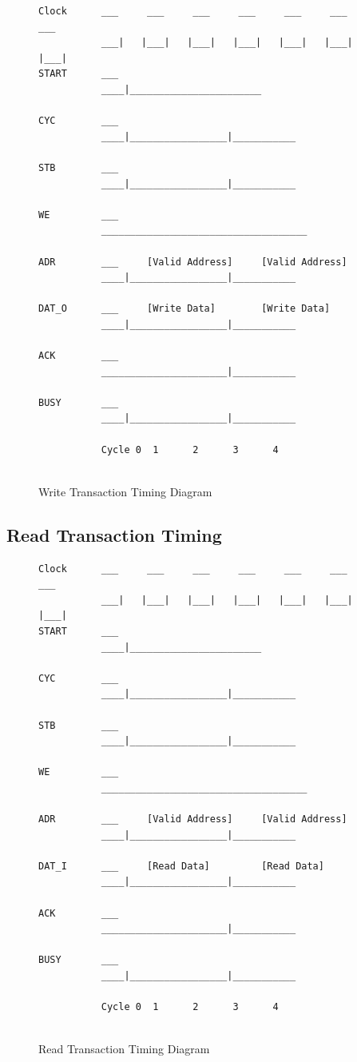 \documentclass[12pt,a4paper]{article}
\begin{document}
\begin{figure}[H]
\centering
\begin{verbatim}
Clock      ___     ___     ___     ___     ___     ___     ___
           ___|   |___|   |___|   |___|   |___|   |___|   |___|
START      ___
           ____|_______________________
           
CYC        ___
           ____|_________________|___________
           
STB        ___
           ____|_________________|___________
           
WE         ___
           ____________________________________
           
ADR        ___     [Valid Address]     [Valid Address]
           ____|_________________|___________
           
DAT_O      ___     [Write Data]        [Write Data]
           ____|_________________|___________
           
ACK        ___
           ______________________|___________
           
BUSY       ___
           ____|_________________|___________

           Cycle 0  1      2      3      4
           
\end{verbatim}
\caption{Write Transaction Timing Diagram}
\end{figure}

\subsection{Read Transaction Timing}

\begin{figure}[H]
\centering
\begin{verbatim}
Clock      ___     ___     ___     ___     ___     ___     ___
           ___|   |___|   |___|   |___|   |___|   |___|   |___|
START      ___
           ____|_______________________
           
CYC        ___
           ____|_________________|___________
           
STB        ___
           ____|_________________|___________
           
WE         ___
           ____________________________________
           
ADR        ___     [Valid Address]     [Valid Address]
           ____|_________________|___________
           
DAT_I      ___     [Read Data]         [Read Data]
           ____|_________________|___________
           
ACK        ___
           ______________________|___________
           
BUSY       ___
           ____|_________________|___________

           Cycle 0  1      2      3      4
           
\end{verbatim}
\caption{Read Transaction Timing Diagram}
\end{figure}
\end{document}
